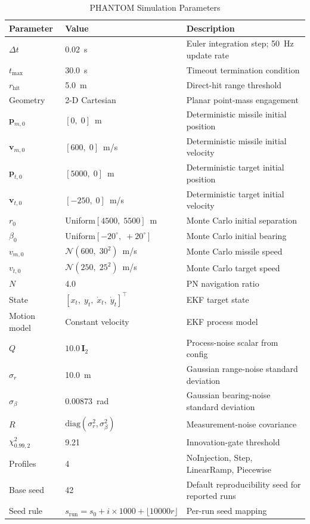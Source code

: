 \documentclass[journal]{IEEEtran}
\begin{document}
\begin{table}[t]
\caption{PHANTOM Simulation Parameters}
\label{tab:params}
\centering
\begin{tabular}{lll}
\toprule
Parameter & Value & Description \\
\midrule
$\Delta t$ & 0.02~s & Euler integration step; 50~Hz update rate \\
$t_{\max}$ & 30.0~s & Timeout termination condition \\
$r_{\mathrm{hit}}$ & 5.0~m & Direct-hit range threshold \\
Geometry & 2-D Cartesian & Planar point-mass engagement \\
$\mathbf{p}_{m,0}$ & $[0,\;0]$~m & Deterministic missile initial position \\
$\mathbf{v}_{m,0}$ & $[600,\;0]$~m/s & Deterministic missile initial velocity \\
$\mathbf{p}_{t,0}$ & $[5000,\;0]$~m & Deterministic target initial position \\
$\mathbf{v}_{t,0}$ & $[-250,\;0]$~m/s & Deterministic target initial velocity \\
$r_0$ & Uniform$[4500,\;5500]$~m & Monte Carlo initial separation \\
$\beta_0$ & Uniform$[-20^\circ,\;+20^\circ]$ & Monte Carlo initial bearing \\
$v_{m,0}$ & $\mathcal{N}(600,\;30^2)$~m/s & Monte Carlo missile speed \\
$v_{t,0}$ & $\mathcal{N}(250,\;25^2)$~m/s & Monte Carlo target speed \\
$N$ & 4.0 & PN navigation ratio \\
State & $[x_t,\;y_t,\;\dot{x}_t,\;\dot{y}_t]^\top$ & EKF target state \\
Motion model & Constant velocity & EKF process model \\
$Q$ & $10.0\,\mathbf{I}_2$ & Process-noise scalar from config \\
$\sigma_r$ & 10.0~m & Gaussian range-noise standard deviation \\
$\sigma_\beta$ & 0.00873~rad & Gaussian bearing-noise standard deviation \\
$R$ & $\mathrm{diag}(\sigma_r^2,\sigma_\beta^2)$ & Measurement-noise covariance \\
$\chi^2_{0.99,2}$ & 9.21 & Innovation-gate threshold \\
Profiles & 4 & NoInjection, Step, LinearRamp, Piecewise \\
Base seed & 42 & Default reproducibility seed for reported runs \\
Seed rule & $s_{\mathrm{run}} = s_0 + i \times 1000 + \lfloor 10000r \rfloor$ & Per-run seed mapping \\
\bottomrule
\end{tabular}
\end{table}
\end{document}
